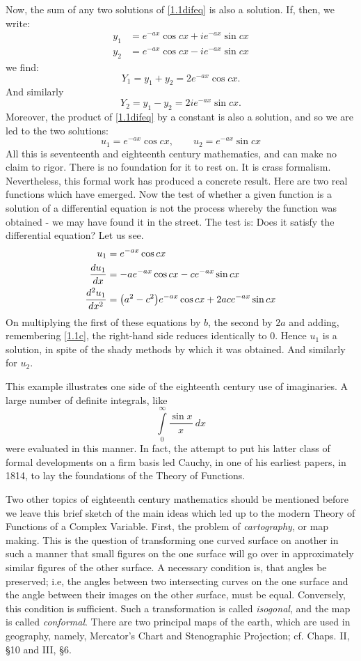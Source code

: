 \documentclass[letter,oneside]{memoir}
\begin{document}
Now, the sum of any two solutions of \ref{1.1difeq} is also a solution. If, then, we write:
\begin{align*}
	y_1&=e^{-ax}\cos cx+ie^{-ax}\sin cx\\
	y_2&=e^{-ax}\cos cx-ie^{-ax}\sin cx
\end{align*} we find:
\[
Y_1=y_1+y_2=2e^{-ax}\cos cx
.\] And similarly 
\[
Y_2=y_1-y_2=2ie^{-ax}\sin cx
.\] Moreover, the product of \ref{1.1difeq} by a constant is also a solution, and so we are led to the two solutions:
\begin{equation}
u_1=e^{-ax}\cos cx, \qquad u_2=e^{-ax}\sin cx
\end{equation} 
All this is seventeenth and eighteenth century mathematics, and can make no claim to rigor. There is no foundation for it to rest on. It is crass formalism. Nevertheless, this formal work has produced a concrete result. Here are two real functions which have emerged. Now the test of whether a given function is a solution of a differential equation is not the process whereby the function was obtained - we may have found it in the street. The test is: Does it satisfy the differential equation? Let us see.
\begin{align*}
	u_1&=e^{-ax}\cos cx\\
	\frac{du_1}{dx} &=-ae^{-ax}\cos cx-ce^{-ax}\sin cx\\
	\frac{d^2u_1}{dx^2} &=\pbr*{a^2-c^2} e^{-ax}\cos cx+2ace^{-ax}\sin cx
\end{align*} On multiplying the first of these equations by $b$, the second by $2a$ and adding, remembering \ref{1.1c}, the right-hand side reduces identically to $0$. Hence $u_1$ is a solution, in spite of the shady methods by which it was obtained. And similarly for $u_2$. 

This example illustrates one side of the eighteenth century use of imaginaries. A large number of definite integrals, like 
\[
\int \limits_{0}^{\infty} \frac{\sin x}{x}  \: dx 
\] were evaluated in this manner. In fact, the attempt to put his latter class of formal developments on a firm basis led Cauchy, in one of his earliest papers, in 1814, to lay the foundations of the Theory of Functions.

Two other topics of eighteenth century mathematics should be mentioned before we leave this brief sketch of the main ideas which led up to the modern Theory of Functions of a Complex Variable. First, the problem of \emph{cartography}, or map making. This is the question of transforming one curved surface on another in such a manner that small figures on the one surface will go over in approximately similar figures of the other surface. A necessary condition is, that angles be preserved; i.e, the angles between two intersecting curves on the one surface and the angle between their images on the other surface, must be equal. Conversely, this condition is sufficient. Such a transformation is called \emph{isogonal}, and the map is called \emph{conformal}. There are two principal maps of the earth, which are used in geography, namely, Mercator's Chart and Stenographic Projection; cf. Chaps. II, \S 10 and III, \S 6. 
\end{document}
